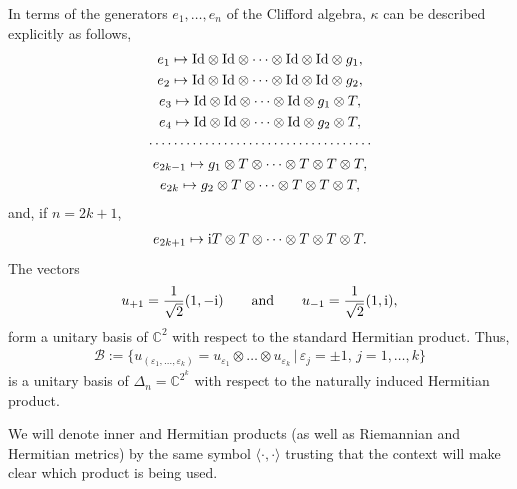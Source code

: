 \documentclass[10pt,a4paper]{amsart}
\numberwithin{equation}{section}
\begin{document}
In terms of the generators $e_1, \dots, e_n$ of the Clifford algebra, $\kappa$ can be
described explicitly as follows,
\begin{gather*}
e_1 \mapsto {\rm Id}\otimes {\rm Id}\otimes \dots\otimes {\rm Id}\otimes {\rm Id}\otimes g_1, \\
e_2 \mapsto {\rm Id}\otimes {\rm Id}\otimes \dots\otimes {\rm Id}\otimes {\rm Id}\otimes g_2, \\
e_3 \mapsto {\rm Id}\otimes {\rm Id}\otimes \dots\otimes {\rm Id}\otimes g_1\otimes T, \\
e_4 \mapsto {\rm Id}\otimes {\rm Id}\otimes \dots\otimes {\rm Id}\otimes g_2\otimes T, \\
\cdots\cdots \cdots\cdots\cdots\cdots\cdots\cdots\cdots\cdots\cdots\cdots \\
e_{2k-1} \mapsto g_1\otimes T\otimes \dots\otimes T\otimes T\otimes T, \\
e_{2k} \mapsto g_2\otimes T\otimes\dots\otimes T\otimes T\otimes T,
\end{gather*}
and, if $n=2k+1$,
\begin{gather*} e_{2k+1}\mapsto {\rm i} T\otimes T\otimes\dots\otimes T\otimes T\otimes T.\end{gather*}
The vectors
\begin{gather*} u_{+1}={1\over \sqrt{2}}(1,-{\rm i})\qquad\mbox{and}\qquad u_{-1}={1\over \sqrt{2}}(1,{\rm i}),\end{gather*}
form a unitary basis of $\mathbb{C}^2$ with respect to the standard Hermitian product. Thus,
\begin{gather*}\mathcal{B}:=\{u_{(\varepsilon_1,\dots,\varepsilon_k)}=u_{\varepsilon_1}\otimes\dots\otimes
u_{\varepsilon_k}\, |\, \varepsilon_j=\pm 1,\, j=1,\dots,k\}\end{gather*}
is a unitary basis of $\Delta_n=\mathbb{C}^{2^k}$ with respect to the naturally induced Hermitian product.

\begin{Remark} We will denote inner and Hermitian products (as well as Riemannian and Hermitian metrics) by the same symbol $\langle \cdot,\cdot\rangle $ trusting that the context will make clear which product is being used.
\end{Remark}
\end{document}

